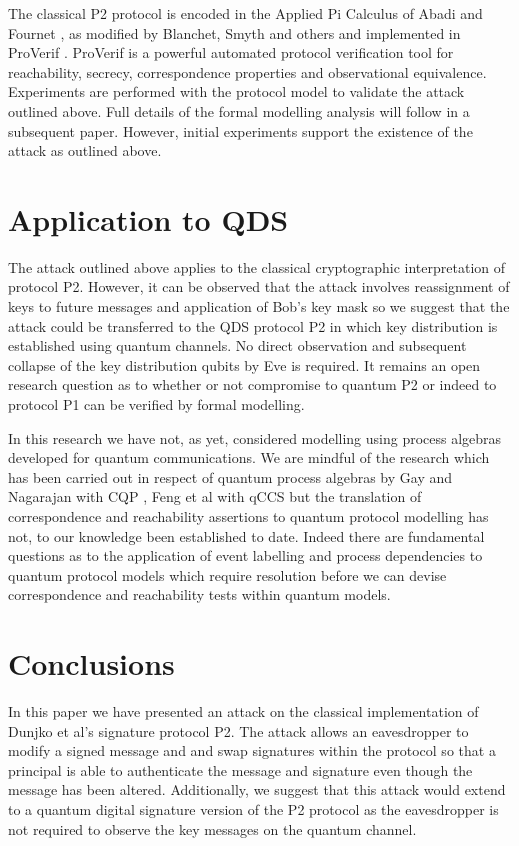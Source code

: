 \documentclass[english]{article}
\begin{document}
The classical P2 protocol is encoded in the Applied Pi Calculus of
Abadi and Fournet \cite{Abadi2001}, as modified by Blanchet, Smyth
and others and implemented in ProVerif \cite{Blanchet2015}. ProVerif
is a powerful automated protocol verification tool for reachability,
secrecy, correspondence properties and observational equivalence.
Experiments are performed with the protocol model to validate the
attack outlined above. Full details of the formal modelling analysis
will follow in a subsequent paper. However, initial experiments support
the existence of the attack as outlined above. 


\section{Application to QDS }

The attack outlined above applies to the classical cryptographic interpretation
of protocol P2. However, it can be observed that the attack involves
reassignment of keys to future messages and application of Bob's key
mask so we suggest that the attack could be transferred to the QDS
protocol P2 in which key distribution is established using quantum
channels. No direct observation and subsequent collapse of the key
distribution qubits by Eve is required. It remains an open research
question as to whether or not compromise to quantum P2 or indeed to
protocol P1 can be verified by formal modelling.

In this research we have not, as yet, considered modelling using process
algebras developed for quantum communications. We are mindful of the
research which has been carried out in respect of quantum process
algebras by Gay and Nagarajan with CQP \cite{Gay2005}, Feng et al
with qCCS \cite{Ying2009} but the translation of correspondence and
reachability assertions to quantum protocol modelling has not, to
our knowledge been established to date. Indeed there are fundamental
questions as to the application of event labelling and process dependencies
to quantum protocol models which require resolution before we can
devise correspondence and reachability tests within quantum models.


\section{Conclusions}

In this paper we have presented an attack on the classical implementation
of Dunjko et al's signature protocol P2. The attack allows an eavesdropper
to modify a signed message and and swap signatures within the protocol
so that a principal is able to authenticate the message and signature
even though the message has been altered. Additionally, we suggest
that this attack would extend to a quantum digital signature version
of the P2 protocol as the eavesdropper is not required to observe
the key messages on the quantum channel.
\end{document}
